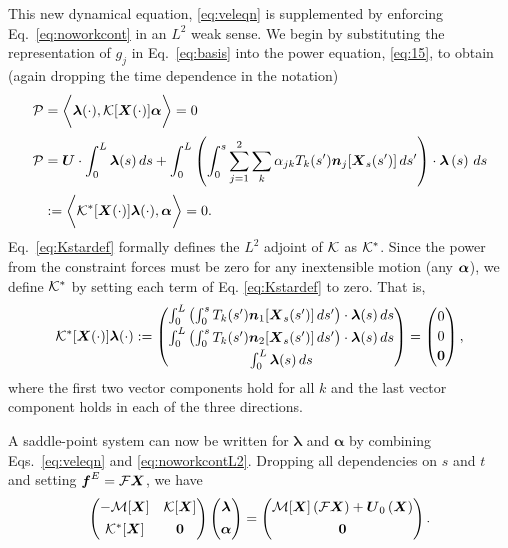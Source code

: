 This new dynamical equation, \eqref{eq:veleqn} is supplemented by enforcing Eq.\ \eqref{eq:noworkcont} in an $L^2$ weak sense. We begin by substituting the representation of $g_j$ in Eq.\ \eqref{eq:basis} into the power equation, \eqref{eq:15}, to obtain (again dropping the time dependence in the notation)
\begin{align}
\label{eq:26}
\mathcal{P} & = \bigg{\langle} \boldsymbol{\lambda}(\cdot),\mathcal{K}[\boldsymbol{X}(\cdot)]\boldsymbol{\alpha}\bigg{\rangle}= 0 \\[2 pt]
\label{eq:Kstardef}
\mathcal{P} & = \boldsymbol{U} \cdot \int_0^L \boldsymbol{\lambda}(s) \, ds + \int_0^L \left(\int_0^{s} \sum_{j=1}^2\sum_{k} \alpha_{jk} T_k(s') \boldsymbol{n}_j[\boldsymbol{X}_s(s')] \, ds'\right)\cdot \boldsymbol{\lambda}\left(s\right) \, ds\\[2 pt]
\nonumber & := \bigg{\langle} \mathcal{K}^*[\boldsymbol{X}(\cdot)]\boldsymbol{\lambda}(\cdot), \boldsymbol{\alpha}\bigg{\rangle} =0. 
\end{align}
Eq.\ \eqref{eq:Kstardef} formally defines the $L^2$ adjoint of $\mathcal{K}$ as $\mathcal{K}^*$. Since the power from the constraint forces must be zero for any inextensible motion (any $\boldsymbol{\alpha}$), we define $\mathcal{K}^*$ by setting each term of Eq. \eqref{eq:Kstardef} to zero. That is,
\begin{equation}
\label{eq:noworkcontL2}
\mathcal{K}^*[\boldsymbol{X}(\cdot)]\boldsymbol{\lambda}(\cdot):=\begin{pmatrix} \int_0^L \left(\int_0^{s} T_k(s') \boldsymbol{n}_1[\boldsymbol{X}_s(s')] \, ds'\right)\cdot \boldsymbol{\lambda}(s) \, ds\\[2 pt] \int_0^L \left(\int_0^{s} T_k(s') \boldsymbol{n}_2[\boldsymbol{X}_s(s')] \, ds'\right)\cdot \boldsymbol{\lambda}(s) \, ds\\[2 pt] \int_0^L \boldsymbol{\lambda}(s) \, ds \end{pmatrix} = \begin{pmatrix} 0 \\[2 pt] 0\\[2 pt] \boldsymbol{0}\end{pmatrix}, 
\end{equation}
where the first two vector components hold for all $k$ and the last vector component holds in each of the three directions.

A saddle-point system can now be written for $\bm{\lambda}$ and $\bm{\alpha}$ by combining Eqs.\ \eqref{eq:veleqn} and \eqref{eq:noworkcontL2}. Dropping all dependencies on $s$ and $t$ and setting $\boldsymbol{f}^E=\mathcal{F}\boldsymbol{X}$, we have
\begin{equation}
\label{eq:saddleL2}
    \begin{pmatrix}
    -\mathcal{M}[\boldsymbol{X}] & \mathcal{K}[\boldsymbol{X}]\\[4 pt]
    \mathcal{K}^*[\boldsymbol{X}] & \boldsymbol{0}
    \end{pmatrix}
    \begin{pmatrix} 
    \boldsymbol{\lambda}\\[4 pt]
    \boldsymbol{\alpha}
    \end{pmatrix} =  \begin{pmatrix} 
    \mathcal{M}[\boldsymbol{X}]\left(\mathcal{F}\boldsymbol{X}\right)+\boldsymbol{U}_0\left(\boldsymbol{X}\right)\\[4 pt]
    \boldsymbol{0}\end{pmatrix}.
\end{equation}

